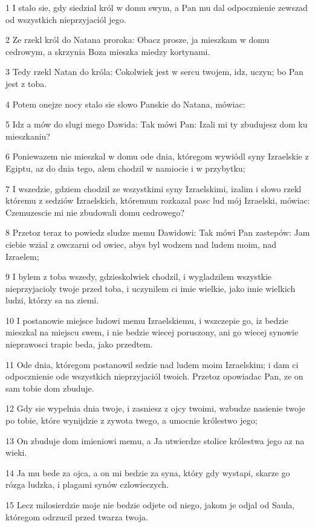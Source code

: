 \par 1 I stalo sie, gdy siedzial król w domu swym, a Pan mu dal odpocznienie zewszad od wszystkich nieprzyjaciól jego.
\par 2 Ze rzekl król do Natana proroka: Obacz prosze, ja mieszkam w domu cedrowym, a skrzynia Boza mieszka miedzy kortynami.
\par 3 Tedy rzekl Natan do króla: Cokolwiek jest w sercu twojem, idz, uczyn; bo Pan jest z toba.
\par 4 Potem onejze nocy stalo sie slowo Panskie do Natana, mówiac:
\par 5 Idz a mów do slugi mego Dawida: Tak mówi Pan: Izali mi ty zbudujesz dom ku mieszkaniu?
\par 6 Poniewazem nie mieszkal w domu ode dnia, któregom wywiódl syny Izraelskie z Egiptu, az do dnia tego, alem chodzil w namiocie i w przybytku;
\par 7 I wszedzie, gdziem chodzil ze wszystkimi syny Izraelskimi, izalim i slowo rzekl któremu z sedziów Izraelskich, któremum rozkazal pasc lud mój Izraelski, mówiac: Czemuzescie mi nie zbudowali domu cedrowego?
\par 8 Przetoz teraz to powiedz sludze memu Dawidowi: Tak mówi Pan zastepów: Jam ciebie wzial z owczarni od owiec, abys byl wodzem nad ludem moim, nad Izraelem;
\par 9 I bylem z toba wszedy, gdzieskolwiek chodzil, i wygladzilem wszystkie nieprzyjacioly twoje przed toba, i uczynilem ci imie wielkie, jako imie wielkich ludzi, którzy sa na ziemi.
\par 10 I postanowie miejsce ludowi memu Izraelskiemu, i wszczepie go, iz bedzie mieszkal na miejscu swem, i nie bedzie wiecej poruszony, ani go wiecej synowie nieprawosci trapic beda, jako przedtem.
\par 11 Ode dnia, któregom postanowil sedzie nad ludem moim Izraelskim; i dam ci odpocznienie ode wszystkich nieprzyjaciól twoich. Przetoz opowiadac Pan, ze on sam tobie dom zbuduje.
\par 12 Gdy sie wypelnia dnia twoje, i zasniesz z ojcy twoimi, wzbudze nasienie twoje po tobie, które wynijdzie z zywota twego, a umocnie królestwo jego;
\par 13 On zbuduje dom imieniowi memu, a Ja utwierdze stolice królestwa jego az na wieki.
\par 14 Ja mu bede za ojca, a on mi bedzie za syna, który gdy wystapi, skarze go rózga ludzka, i plagami synów czlowieczych.
\par 15 Lecz milosierdzie moje nie bedzie odjete od niego, jakom je odjal od Saula, któregom odrzucil przed twarza twoja.

